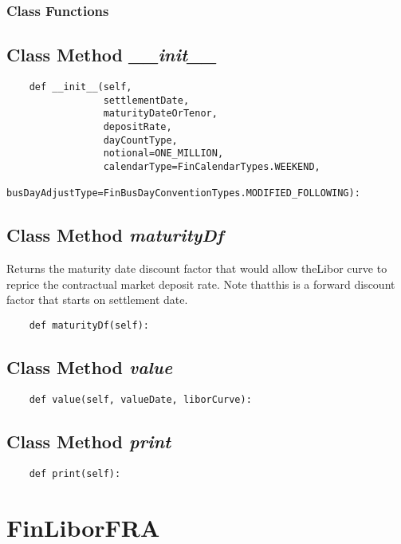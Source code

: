 \documentclass[twoside,11pt]{book}
\begin{document}
\subsubsection{Class Functions}

\subsection{Class Method {\it \_\_init\_\_}}


\begin{lstlisting}
    def __init__(self,
                 settlementDate,
                 maturityDateOrTenor,
                 depositRate,
                 dayCountType,
                 notional=ONE_MILLION,
                 calendarType=FinCalendarTypes.WEEKEND,
                 busDayAdjustType=FinBusDayConventionTypes.MODIFIED_FOLLOWING):
\end{lstlisting}

\subsection{Class Method {\it maturityDf}}
Returns the maturity date discount factor that would allow theLibor curve to reprice the contractual market deposit rate. Note thatthis is a forward discount factor that starts on settlement date.

\begin{lstlisting}
    def maturityDf(self):
\end{lstlisting}

\subsection{Class Method {\it value}}


\begin{lstlisting}
    def value(self, valueDate, liborCurve):
\end{lstlisting}

\subsection{Class Method {\it print}}


\begin{lstlisting}
    def print(self):
\end{lstlisting}

\newpage
\section{FinLiborFRA}
\end{document}
